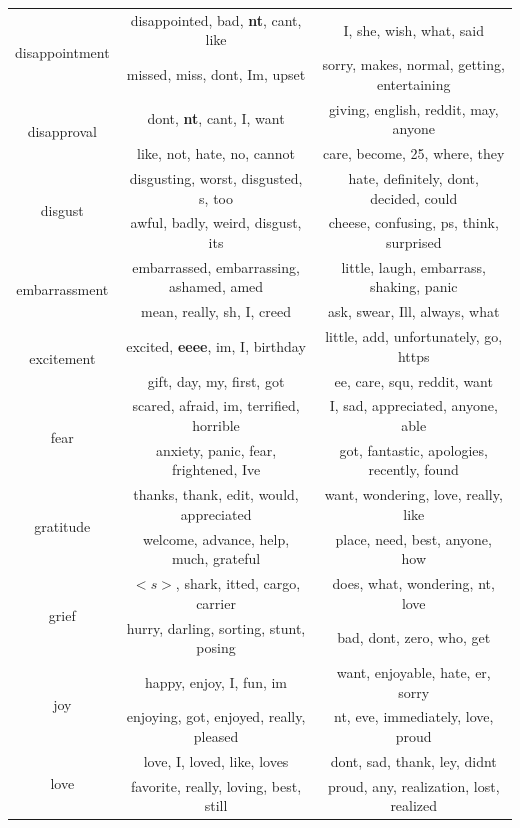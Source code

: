 \documentclass[conference,compsoc]{IEEEtran}
\begin{document}
\begin{table}[ht]
\begin{tabular}{|c|c|c|}
\hline
\multirow{2}{*}{disappointment} & disappointed, bad, \textbf{nt}, cant, like & I, she, wish, what, said \\
& missed, miss, dont, Im, upset & sorry, makes, normal, getting, entertaining \\
\hline
\multirow{2}{*}{disapproval} & dont, \textbf{nt}, cant, I, want & giving, english, reddit, may, anyone \\
& like, not, hate, no, cannot & care, become, 25, where, they \\
\hline
\multirow{2}{*}{disgust} & disgusting, worst, disgusted, s, too & hate, definitely, dont, decided, could \\
& awful, badly, weird, disgust, its & cheese, confusing, ps, think, surprised \\
\hline
\multirow{2}{*}{embarrassment} & embarrassed, embarrassing, ashamed, amed & little, laugh, embarrass, shaking, panic \\
& mean, really, sh, I, creed & ask, swear, Ill, always, what \\
\hline
\multirow{2}{*}{excitement} & excited, \textbf{eeee}, im, I, birthday & little, add, unfortunately, go, https \\
& gift, day, my, first, got & ee, care, squ, reddit, want \\
\hline
\multirow{2}{*}{fear} & scared, afraid, im, terrified, horrible & I, sad, appreciated, anyone, able \\
& anxiety, panic, fear, frightened, Ive & got, fantastic, apologies, recently, found \\
\hline
\multirow{2}{*}{gratitude} & thanks, thank, edit, would, appreciated & want, wondering, love, really, like \\
& welcome, advance, help, much, grateful & place, need, best, anyone, how \\
\hline
\multirow{2}{*}{grief} & $<s>$, shark, itted, cargo, carrier & does, what, wondering, nt, love \\
& hurry, darling, sorting, stunt, posing & bad, dont, zero, who, get \\
\hline
\multirow{2}{*}{joy} & happy, enjoy, I, fun, im & want, enjoyable, hate, er, sorry \\
& enjoying, got, enjoyed, really, pleased & nt, eve, immediately, love, proud \\
\hline
\multirow{2}{*}{love} & love, I, loved, like, loves & dont, sad, thank, ley, didnt \\
& favorite, really, loving, best, still & proud, any, realization, lost, realized \\

\end{tabular}
\end{table}
\end{document}
